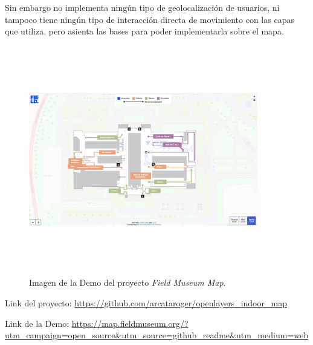 Sin embargo no implementa ningún tipo de geolocalización de usuarios, ni tampoco tiene ningún tipo de interacción directa de movimiento con las capas que utiliza, pero asienta las bases para poder implementarla sobre el mapa.
\FloatBarrier

\begin{figure}
    \centering
    \includegraphics[width=10cm,height=10cm,keepaspectratio]{img/field_map_museum.png}
    \caption{Imagen de la Demo del proyecto \textit{Field Museum Map}.}
    \label{fig:field_museum_demo_img}
\end{figure}
\FloatBarrier

Link del proyecto: \url{https://github.com/arcataroger/openlayers_indoor_map}

Link de la Demo: \url{https://map.fieldmuseum.org/?utm_campaign=open_source&utm_source=github_readme&utm_medium=web}